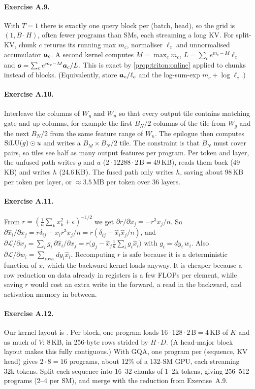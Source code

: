 \paragraph{Exercise A.9.} With $T=1$ there is exactly one query block per (batch, head),
so the grid is $(1,B\cdot H)$, often fewer programs than SMs, each streaming a long KV.
For split-KV, chunk $c$ returns its running max $m_c$, normaliser $\ell_c$ and
unnormalised accumulator $\bm{a}_c$. A second kernel computes $M=\max_c m_c$,
$L=\sum_c e^{m_c-M}\ell_c$ and $\bm{o}=\sum_c e^{m_c-M}\bm{a}_c/L$. This is exact by
\cref{prop:triton:online} applied to chunks instead of blocks. (Equivalently, store
$\bm{a}_c/\ell_c$ and the log-sum-exp $m_c+\log\ell_c$.)

\paragraph{Exercise A.10.} Interleave the columns of $W_g$ and $W_u$ so that every
output tile contains matching gate and up columns, for example the first $B_N/2$ columns
of the tile from $W_g$ and the next $B_N/2$ from the same feature range of $W_u$. The
epilogue then computes $\operatorname{SiLU}(g)\odot u$ and writes a $B_M\times B_N/2$ tile. The
constraint is that $B_N$ must cover pairs, so tiles see half as many output features
per program. Per token and layer, the unfused path writes $g$ and $u$
($2\cdot12288\cdot2$\,B$=49$\,KB), reads them back (49\,KB) and writes $h$ (24.6\,KB).
The fused path only writes $h$, saving about 98\,KB per token per layer, or
$\approx3.5$\,MB per token over 36 layers.

\paragraph{Exercise A.11.} From $r=(\frac1n\sum_kx_k^2+\epsilon)^{-1/2}$ we get
$\partial r/\partial x_j=-r^3x_j/n$. So
$\partial\hat x_i/\partial x_j=r\delta_{ij}-x_ir^3x_j/n=r(\delta_{ij}-\hat x_i\hat x_j/n)$,
and $\partial\mathcal L/\partial x_j=\sum_ig_i\,\partial\hat x_i/\partial x_j
=r\big(g_j-\hat x_j\frac1n\sum_ig_i\hat x_i\big)$ with $g_i=dy_i\,w_i$. Also
$\partial\mathcal L/\partial w_i=\sum_{\text{rows}}dy_i\hat x_i$. Recomputing $r$ is
safe because it is a deterministic function of $x$, which the backward kernel loads
anyway. It is cheaper because a row reduction on data already in registers is a few
FLOPs per element, while saving $r$ would cost an extra write in the forward, a read in
the backward, and activation memory in between.

\paragraph{Exercise A.12.} Our kernel layout is .
Per block, one program loads $16\cdot128\cdot2$\,B$=4$\,KB of $K$ and as much of $V$:
8\,KB, in 256-byte rows strided by $H\cdot D$. (A head-major block layout makes this
fully contiguous.) With GQA, one program per (sequence, KV head) gives $2\cdot8=16$
programs, about 12\% of a 132-SM GPU, each streaming 32k tokens. Split each sequence
into 16--32 chunks of 1--2k tokens, giving 256--512 programs (2--4 per SM), and merge
with the reduction from Exercise~A.9.
